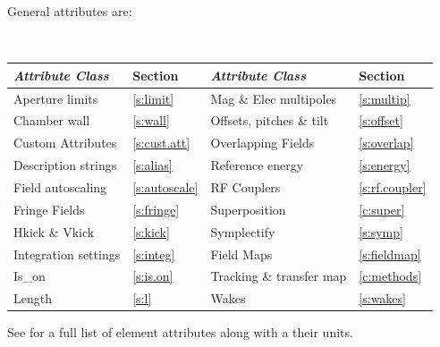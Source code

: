General  attributes are:
\begin{center}
\tt
\begin{tabular}{llll} \toprule
  {\sl Attribute Class}      & Section           & {\sl Attribute Class}      & Section            \\ \midrule
  Aperture limits            & \ref{s:limit}     & Mag \& Elec multipoles     & \ref{s:multip}     \\
  Chamber wall               & \ref{s:wall}      & Offsets, pitches \& tilt   & \ref{s:offset}     \\ 
  Custom Attributes          & \ref{s:cust.att}  & Overlapping Fields         & \ref{s:overlap}    \\ 
  Description strings        & \ref{s:alias}     & Reference energy           & \ref{s:energy}     \\ 
  Field autoscaling          & \ref{s:autoscale} & RF Couplers                & \ref{s:rf.coupler} \\ 
  Fringe Fields              & \ref{s:fringe}    & Superposition              & \ref{c:super}      \\ 
  Hkick \& Vkick             & \ref{s:kick}      & Symplectify                & \ref{s:symp}       \\ 
  Integration settings       & \ref{s:integ}     & Field Maps                 & \ref{s:fieldmap}   \\ 
  Is_on                      & \ref{s:is.on}     & Tracking \& transfer map   & \ref{c:methods}    \\ 
  Length                     & \ref{s:l}         & Wakes                      & \ref{s:wakes}      \\ 
  \bottomrule
\end{tabular}
\end{center}
\toffset
See  for a full list of element attributes along with a their units.


